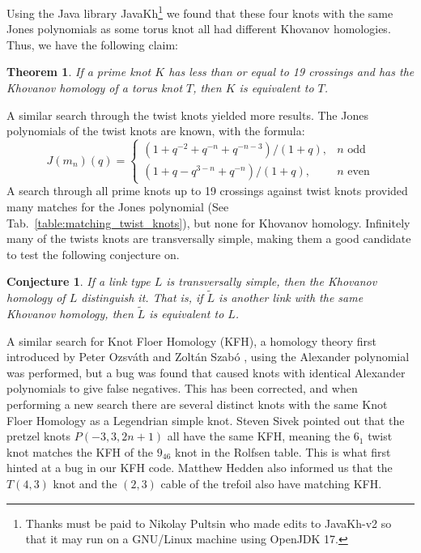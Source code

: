 \documentclass{article}
\theoremstyle{plain}
\newtheorem{theorem}{Theorem}
\newtheorem{conjecture}{Conjecture}
\begin{document}
        \par\hfill\par
        Using the Java library JavaKh\footnote{%
            Thanks must be paid to Nikolay Pultsin who made edits to
            JavaKh-v2 so that it may run on a GNU/Linux machine using
            OpenJDK 17.
        }
        we found that these four knots with the same Jones polynomials as some
        torus knot all had different Khovanov homologies. Thus, we have the
        following claim:
        \begin{theorem}
            If a prime knot $K$ has less than or equal to 19 crossings and has
            the Khovanov homology of a torus knot $T$,
            then $K$ is equivalent to $T$.
        \end{theorem}
        A similar search through the twist knots yielded more results.
        The Jones polynomials of the twist knots are known, with the formula:
        \begin{equation}
            J(m_{n})(q)=
            \begin{cases}
                (1+q^{-2}+q^{-n}+q^{-n-3})/(1+q),&n\textrm{ odd}\\
                (1+q-q^{3-n}+q^{-n})/(1+q),&n\textrm{ even}
            \end{cases}
        \end{equation}
        A search through all prime knots up to 19 crossings against twist knots
        provided many matches for the Jones polynomial
        (See Tab.~\ref{table:matching_twist_knots}), but
        none for Khovanov homology. Infinitely many of the twists knots are
        transversally simple, making them a good candidate to test the following
        conjecture on.
        \begin{conjecture}
            If a link type $L$ is transversally simple, then the Khovanov
            homology of $L$ distinguish it. That is, if $\tilde{L}$
            is another link with the same Khovanov homology, then $\tilde{L}$ is
            equivalent to $L$.
        \end{conjecture}
        A similar search for Knot Floer Homology (KFH), a homology theory
        first introduced by Peter Ozsv\'{a}th and Zolt\'{a}n Szab\'{o}
        \cite{ozsvathszabo2004}, using the Alexander polynomial
        was performed, but a bug was found that caused knots with identical
        Alexander polynomials to give false negatives. This has been corrected,
        and when performing a new search there are several distinct knots
        with the same Knot Floer Homology as a Legendrian simple knot. Steven
        Sivek pointed
        out that the pretzel knots $P(-3,3,2n+1)$ all have the same KFH, meaning
        the $6_{1}$ twist knot matches the KFH of the $9_{46}$ knot in the
        Rolfsen table. This is what first hinted at a bug in our KFH code.
        Matthew Hedden also informed us that the $T(4,3)$ knot and the
        $(2,3)$ cable of the trefoil also have matching KFH.
\end{document}
